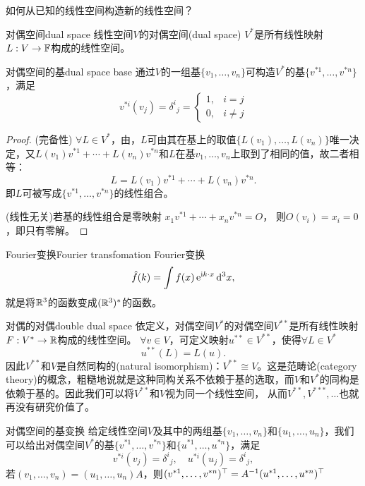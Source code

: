 如何从已知的线性空间构造新的线性空间？
\begin{definition}{对偶空间}{dual space}
	线性空间$V$的对偶空间(dual space) $V^\ast$是所有线性映射$L:V\to\mathbb F$构成的线性空间。
\end{definition}
\begin{theorem}{对偶空间的基}{dual space base}
	通过$V$的一组基$\{v_1,\ldots,v_n\}$可构造$V^\ast$的基$\{v^{\ast 1},\ldots,v^{\ast n}\}$，满足
	\begin{equation}
		v^{\ast i}(v_j)=\delta^i{}_j=
		\begin{cases}
			1,&i=j\\0,&i\neq j
		\end{cases}
	\end{equation}
\end{theorem}
\begin{proof}
	(完备性) $\forall L\in V^\ast$，由，$L$可由其在基上的取值$\{L(v_1),\ldots,L(v_n)\}$唯一决定，又$L(v_1)v^{\ast 1}+\cdots+L(v_n)v^{\ast n}$和$L$在基$v_1,\ldots,v_n$上取到了相同的值，故二者相等：
	\[
		L=L(v_1)v^{\ast 1}+\cdots+L(v_n)v^{\ast n}.
	\]
	即$L$可被写成$\{v^{\ast 1},\ldots,v^{\ast n}\}$的线性组合。

	(线性无关)若基的线性组合是零映射
	$x_1v^{\ast 1}+\cdots+x_nv^{\ast n}=O$，
	则$O(v_i)=x_i=0$，即只有零解。
\end{proof}
\begin{example}{Fourier变换}{Fourier transfomation}
	Fourier变换
	\[
		\hat f(k)=\int f(x)\mathop{}\!\mathrm{e}^{\mathrm{i} k\cdot x}\mathop{}\!\mathrm{d}^3x,
	\]
	就是将$\mathbb R^3$的函数变成$(\mathbb R^3)^\ast$的函数。
\end{example}
\begin{example}{对偶的对偶}{double dual space}
	依定义，对偶空间$V^\ast$的对偶空间$V^{\ast\ast}$是所有线性映射$F:V^\ast\to\mathbb R$构成的线性空间。%
	$\forall v\in V$，可定义映射$u^{\ast\ast}\in V^{\ast\ast}$，使得$\forall L\in V^\ast$
	\begin{equation}
		u^{\ast\ast}(L)=L(u).
	\end{equation}
	因此$V^{\ast\ast}$和$V$是自然同构的(natural isomorphism)：$V^{\ast\ast}\cong V$。这是范畴论(category theory)的概念，粗糙地说就是这种同构关系不依赖于基的选取，而$V$和$V^\ast$的同构是依赖于基的。因此我们可以将$V^{\ast\ast}$和$V$视为同一个线性空间，
	从而$V^{\ast\ast},V^{\ast\ast\ast},\ldots$也就再没有研究价值了。
\end{example}
\begin{theorem}{对偶空间的基变换}{}
	给定线性空间$V$及其中的两组基$\{v_1,\ldots,v_n\}$和$\{u_1,\ldots,u_n\}$，我们可以给出对偶空间$V^\ast$的基$\{v^{\ast 1},\ldots,v^{\ast n}\}$和$\{u^{\ast 1},\ldots,u^{\ast n}\}$，满足
	\[
		v^{\ast i}(v_j)=\delta^i{}_j,\quad u^{\ast i}(u_j)=\delta^i{}_j,
	\]
	若$(v_1,\ldots,v_n)=(u_1,\ldots,u_n)A$，则$(v^{\ast 1},\ldots,v^{\ast n})^\top=A^{-1}(u^{\ast 1},\ldots,u^{\ast n})^\top$
\end{theorem}
